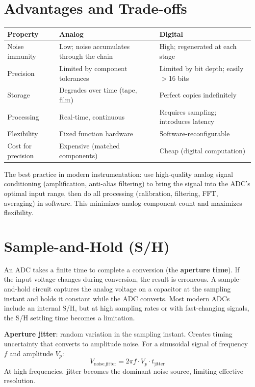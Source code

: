 \documentclass[11pt,letterpaper,twoside,openany]{book}
\begin{document}
\section{Advantages and Trade-offs}
\begin{table}[htbp]\centering\small
\begin{tabularx}{\textwidth}{l X X}
\toprule
\textbf{Property} & \textbf{Analog} & \textbf{Digital} \\
\midrule
Noise immunity & Low; noise accumulates through the chain & High; regenerated at each stage \\
Precision & Limited by component tolerances & Limited by bit depth; easily $>$16 bits \\
Storage & Degrades over time (tape, film) & Perfect copies indefinitely \\
Processing & Real-time, continuous & Requires sampling; introduces latency \\
Flexibility & Fixed function hardware & Software-reconfigurable \\
Cost for precision & Expensive (matched components) & Cheap (digital computation) \\
\bottomrule
\end{tabularx}
\end{table}

\begin{tipbox}
The best practice in modern instrumentation: use high-quality analog signal conditioning (amplification, anti-alias filtering) to bring the signal into the ADC's optimal input range, then do all processing (calibration, filtering, FFT, averaging) in software. This minimizes analog component count and maximizes flexibility.
\end{tipbox}


\section{Sample-and-Hold (S/H)}
An ADC takes a finite time to complete a conversion (the \textbf{aperture time}). If the input voltage changes during conversion, the result is erroneous. A sample-and-hold circuit captures the analog voltage on a capacitor at the sampling instant and holds it constant while the ADC converts. Most modern ADCs include an internal S/H, but at high sampling rates or with fast-changing signals, the S/H settling time becomes a limitation.

\textbf{Aperture jitter}: random variation in the sampling instant. Creates timing uncertainty that converts to amplitude noise. For a sinusoidal signal of frequency $f$ and amplitude $V_p$:
\begin{equation}
V_{\text{noise,jitter}} = 2\pi f \cdot V_p \cdot t_{\text{jitter}}
\end{equation}
At high frequencies, jitter becomes the dominant noise source, limiting effective resolution.
\end{document}

